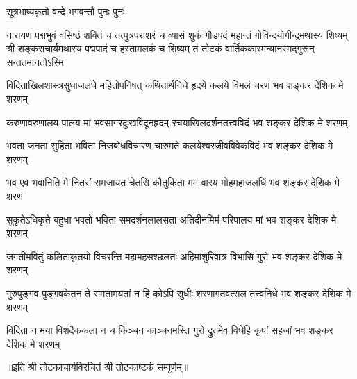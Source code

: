 

%
{सूत्रभाष्यकृतौ वन्दे भगवन्तौ पुनः पुनः}%

\fourlineindentedshloka
{नारायणं पद्मभुवं वसिष्ठं शक्तिं च तत्पुत्रपराशरं च}%
{व्यासं शुकं गौडपदं महान्तं गोविन्दयोगीन्द्रमथास्य शिष्यम्}%
{श्री शङ्कराचार्यमथास्य पद्मपादं च हस्तामलकं च शिष्यम्}%
{तं तोटकं वार्तिककारमन्यानस्मद्गुरून् सन्ततमानतोऽस्मि}%

\twolineshloka
{विदिताखिलशास्त्रसुधाजलधे महितोपनिषत् कथितार्थनिधे}%
{हृदये कलये विमलं चरणं भव शङ्कर देशिक मे शरणम्}%


\twolineshloka
{करुणावरुणालय पालय मां भवसागरदुःखविदूनहृदम्}%
{रचयाखिलदर्शनतत्त्वविदं भव शङ्कर देशिक मे शरणम्}%


\twolineshloka
{भवता जनता सुहिता भविता निजबोधविचारण चारुमते}%
{कलयेश्वरजीवविवेकविदं भव शङ्कर देशिक मे शरणम्}%


\twolineshloka
{भव एव भवानिति मे नितरां समजायत चेतसि कौतुकिता}%
{मम वारय मोहमहाजलधिं भव शङ्कर देशिक मे शरणं }%


\twolineshloka
{सुकृतेऽधिकृते बहुधा भवतो भविता समदर्शनलालसता}%
{अतिदीनमिमं परिपालय मां भव शङ्कर देशिक मे शरणम्}%


\twolineshloka
{जगतीमवितुं कलिताकृतयो विचरन्ति महामहसश्छलतः}%
{अहिमांशुरिवात्र विभासि गुरो भव शङ्कर देशिक मे शरणम्}%


\twolineshloka
{गुरुपुङ्गव पुङ्गवकेतन ते समतामयतां न हि कोऽपि सुधीः}%
{शरणागतवत्सल तत्त्वनिधे भव शङ्कर देशिक मे शरणम्}%


\twolineshloka
{विदिता न मया विशदैककला न च किञ्चन काञ्चनमस्ति गुरो}%
{द्रुतमेव विधेहि कृपां सहजां भव शङ्कर देशिक मे शरणम्}%

॥इति श्री तोटकाचार्यविरचितं श्री तोटकाष्टकं सम्पूर्णम्॥